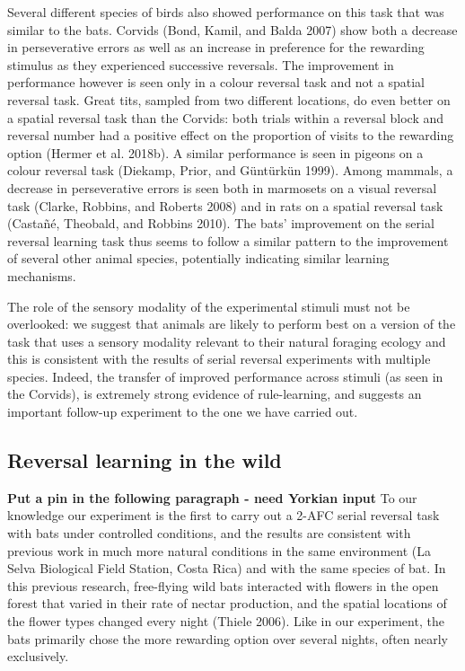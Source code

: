 \documentclass[
]{article}
\begin{document}
Several different species of birds also showed performance on this task that was similar to the bats. Corvids (Bond, Kamil, and Balda 2007) show both a decrease in perseverative errors as well as an increase in preference for the rewarding stimulus as they experienced successive reversals. The improvement in performance however is seen only in a colour reversal task and not a spatial reversal task. Great tits, sampled from two different locations, do even better on a spatial reversal task than the Corvids: both trials within a reversal block and reversal number had a positive effect on the proportion of visits to the rewarding option (Hermer et al. 2018b). A similar performance is seen in pigeons on a colour reversal task (Diekamp, Prior, and Güntürkün 1999). Among mammals, a decrease in perseverative errors is seen both in marmosets on a visual reversal task (Clarke, Robbins, and Roberts 2008) and in rats on a spatial reversal task (Castañé, Theobald, and Robbins 2010). The bats' improvement on the serial reversal learning task thus seems to follow a similar pattern to the improvement of several other animal species, potentially indicating similar learning mechanisms.

The role of the sensory modality of the experimental stimuli must not be overlooked: we suggest that animals are likely to perform best on a version of the task that uses a sensory modality relevant to their natural foraging ecology and this is consistent with the results of serial reversal experiments with multiple species. Indeed, the transfer of improved performance across stimuli (as seen in the Corvids), is extremely strong evidence of rule-learning, and suggests an important follow-up experiment to the one we have carried out.

\hypertarget{reversal-learning-in-the-wild}{%
\subsection{Reversal learning in the wild}\label{reversal-learning-in-the-wild}}

\textbf{Put a pin in the following paragraph - need Yorkian input} To our knowledge our experiment is the first to carry out a 2-AFC serial reversal task with bats under controlled conditions, and the results are consistent with previous work in much more natural conditions in the same environment (La Selva Biological Field Station, Costa Rica) and with the same species of bat. In this previous research, free-flying wild bats interacted with flowers in the open forest that varied in their rate of nectar production, and the spatial locations of the flower types changed every night (Thiele 2006). Like in our experiment, the bats primarily chose the more rewarding option over several nights, often nearly exclusively.
\end{document}
